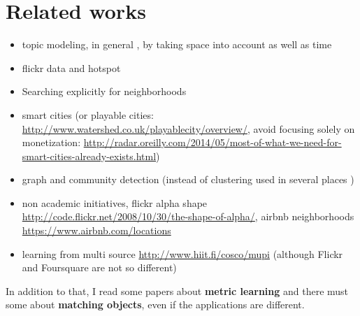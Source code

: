 \chapter{Related works}
\label{chap:related}

\begin{itemize}

\item topic modeling, in general \autocite{topicModel}, by taking space into
account \autocite{GeoTopicYin11, GeoTopicKurashima2013, nestedChinese13,%
NonGaussianTopicKling14} as well as time \autocite{GeoScope, TwitterBurst13}


\item flickr data and hotspot \autocite{TagHotspot12, Hotspots12}

\item Searching explicitly for neighborhoods
\autocite{Rattenbury2009, Livehoods12, SocioMap12, Hoodsquare13}

\item smart cities \autocite{HelsinkiSCC11, Eunoia13, SmartCities13} (or
playable cities: \url{http://www.watershed.co.uk/playablecity/overview/},
\ie{} avoid focusing solely on monetization:
\url{http://radar.oreilly.com/2014/05/most-of-what-we-need-for-smart-cities-already-exists.html})


\item graph and community detection (instead of clustering used in several
places \autocite{PositinalCluster14})

\item non academic initiatives, flickr alpha shape
\url{http://code.flickr.net/2008/10/30/the-shape-of-alpha/}, airbnb
neighborhoods \url{https://www.airbnb.com/locations}

\item learning from multi source \url{http://www.hiit.fi/cosco/mupi} (although
Flickr and Foursquare are not so different)

\end{itemize}

In addition to that, I read some papers about \textbf{metric learning} and
there must some about \textbf{matching objects}, even if the applications are
different.

